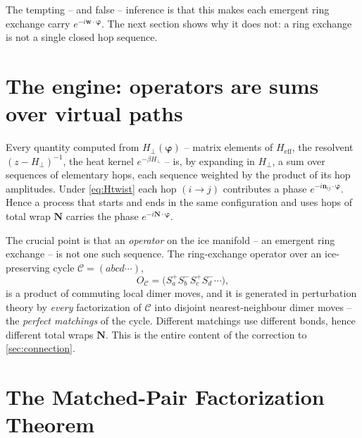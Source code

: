 \documentclass[11pt,letterpaper]{article}
\newcommand{\bvarphi}{\bm{\varphi}}
\newcommand{\bw}{\mathbf{w}}
\newcommand{\bn}{\mathbf{n}}
\newcommand{\bN}{\mathbf{N}}
\newcommand{\Hperp}{H_{\perp}}
\newcommand{\Heff}{H_{\mathrm{eff}}}
\theoremstyle{plain}
\theoremstyle{definition}
\begin{document}
The tempting -- and false -- inference is that this makes each emergent
ring exchange carry $e^{-i\bw\cdot\bvarphi}$. The next section shows why
it does not: a ring exchange is not a single closed hop sequence.

\section{The engine: operators are sums over virtual paths}
\label{sec:pathexp}

Every quantity computed from $\Hperp(\bvarphi)$ -- matrix elements of
$\Heff$, the resolvent $(z-\Hperp)^{-1}$, the heat kernel
$e^{-\beta\Hperp}$ -- is, by expanding in $\Hperp$, a sum over sequences
of elementary hops, each sequence weighted by the product of its hop
amplitudes. Under \eqref{eq:Htwist} each hop $(i\!\to\!j)$ contributes a
phase $e^{-i\bn_{ij}\cdot\bvarphi}$. Hence a process that starts and ends
in the same configuration and uses hops of total wrap $\bN$ carries the
phase $e^{-i\bN\cdot\bvarphi}$.

The crucial point is that an \emph{operator} on the ice manifold -- an
emergent ring exchange -- is not one such sequence. The ring-exchange
operator over an ice-preserving cycle $\mathcal C=(a b c d\cdots)$,
\begin{equation}
O_{\mathcal C}=\bigl(S^+_aS^-_bS^+_cS^-_d\cdots\bigr),
\end{equation}
is a product of commuting local dimer moves, and it is generated in
perturbation theory by \emph{every} factorization of $\mathcal C$ into
disjoint nearest-neighbour dimer moves -- the \emph{perfect matchings}
of the cycle. Different matchings use different bonds, hence different
total wraps $\bN$. This is the entire content of the correction to
\cref{sec:connection}.

\section{The Matched-Pair Factorization Theorem}
\label{sec:master}
\end{document}
